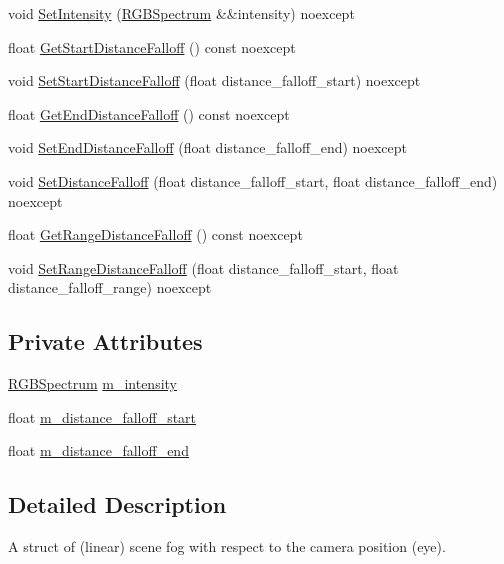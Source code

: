 \begin{DoxyCompactItemize}
void \hyperlink{structmage_1_1_scene_fog_aa953b6e08e2f6bcecfbb906959e876ea}{Set\+Intensity} (\hyperlink{structmage_1_1_r_g_b_spectrum}{R\+G\+B\+Spectrum} \&\&intensity) noexcept
\item 
float \hyperlink{structmage_1_1_scene_fog_ad3b72493806860f0e829f1ff738f1895}{Get\+Start\+Distance\+Falloff} () const noexcept
\item 
void \hyperlink{structmage_1_1_scene_fog_a1140bdafb20b861dfa04b1213ff72644}{Set\+Start\+Distance\+Falloff} (float distance\+\_\+falloff\+\_\+start) noexcept
\item 
float \hyperlink{structmage_1_1_scene_fog_a9f2d7ed1c03054ca305b500059c8c1f1}{Get\+End\+Distance\+Falloff} () const noexcept
\item 
void \hyperlink{structmage_1_1_scene_fog_a623fce3bfdc7f8898bae4a9ac75646c9}{Set\+End\+Distance\+Falloff} (float distance\+\_\+falloff\+\_\+end) noexcept
\item 
void \hyperlink{structmage_1_1_scene_fog_a49c36bf6ff1b486e365abf81200eb7e0}{Set\+Distance\+Falloff} (float distance\+\_\+falloff\+\_\+start, float distance\+\_\+falloff\+\_\+end) noexcept
\item 
float \hyperlink{structmage_1_1_scene_fog_a172532694595ff1919a4d062d9ffaccb}{Get\+Range\+Distance\+Falloff} () const noexcept
\item 
void \hyperlink{structmage_1_1_scene_fog_a8b576af97ac9502af5fd913c1aa18391}{Set\+Range\+Distance\+Falloff} (float distance\+\_\+falloff\+\_\+start, float distance\+\_\+falloff\+\_\+range) noexcept
\end{DoxyCompactItemize}
\subsection*{Private Attributes}
\begin{DoxyCompactItemize}
\item 
\hyperlink{structmage_1_1_r_g_b_spectrum}{R\+G\+B\+Spectrum} \hyperlink{structmage_1_1_scene_fog_ad3758984c5a1941cd883dd82f8ebe975}{m\+\_\+intensity}
\item 
float \hyperlink{structmage_1_1_scene_fog_ad3a788fe93c541347e96c470fc874453}{m\+\_\+distance\+\_\+falloff\+\_\+start}
\item 
float \hyperlink{structmage_1_1_scene_fog_af5945c293556cc515a7daf324c11e27a}{m\+\_\+distance\+\_\+falloff\+\_\+end}
\end{DoxyCompactItemize}


\subsection{Detailed Description}
A struct of (linear) scene fog with respect to the camera position (eye). 

